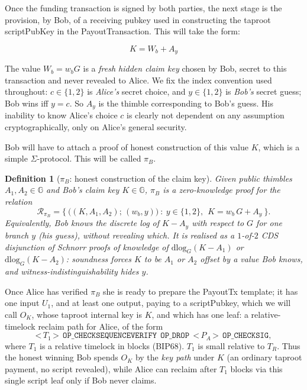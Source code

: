 \documentclass[11pt]{article}
\newtheorem{definition}{Definition}
\begin{document}
Once the funding transaction is signed by both parties, the next stage is the provision, by Bob, of a receiving pubkey used in constructing the taproot scriptPubKey in the PayoutTransaction. This will take the form:

\[ K = W_b + A_y \]

The value $W_b = w_b G$ is a \emph{fresh hidden claim key} chosen by Bob, secret to this transaction and never revealed to Alice. We fix the index convention used throughout: $c\in\{1,2\}$ is \emph{Alice's} secret choice, and $y\in\{1,2\}$ is \emph{Bob's} secret guess; Bob wins iff $y=c$. So $A_y$ is the thimble corresponding to Bob's guess. His inability to know Alice's choice $c$ is clearly not dependent on any assumption cryptographically, only on Alice's general security.

Bob will have to attach a proof of honest construction of this value $K$, which is a simple $\Sigma$-protocol. This will be called $\pi_B$.

\begin{definition}[$\pi_B$: honest construction of the claim key]
\label{def:piB}
Given public thimbles $A_1,A_2\in\mathbb{G}$ and Bob's claim key $K\in\mathbb{G}$, $\pi_B$ is a zero-knowledge proof for the relation
\[
\mathcal{R}_{\pi_B}=\Big\{\ \big((K,A_1,A_2);\,(w_b,y)\big)\ :\ y\in\{1,2\},\ \ K = w_b\,G + A_y\ \Big\}.
\]
Equivalently, Bob knows the discrete log of $K-A_y$ with respect to $G$ for one branch $y$ (his guess), \emph{without revealing which}. It is realised as a $1$-of-$2$ CDS disjunction \cite{cds} of Schnorr proofs of knowledge of $\mathrm{dlog}_G(K-A_1)$ or $\mathrm{dlog}_G(K-A_2)$: soundness forces $K$ to be $A_1$ or $A_2$ offset by a value Bob knows, and witness-indistinguishability hides $y$.
\end{definition}

Once Alice has verified $\pi_B$ she is ready to prepare the PayoutTx template; it has one input $U_1$, and at least one output, paying to a scriptPubkey, which we will call $O_K$, whose taproot internal key is $K$, and which has one leaf: a relative-timelock reclaim path for Alice, of the form
\[
\texttt{<}\,T_1\,\texttt{>}\ \ \texttt{OP\_CHECKSEQUENCEVERIFY}\ \ \texttt{OP\_DROP}\ \ \texttt{<}\,P_A\,\texttt{>}\ \ \texttt{OP\_CHECKSIG},
\]
where $T_1$ is a relative timelock in blocks (BIP68). $T_1$ is small relative to $T_R$. Thus the honest winning Bob spends $O_K$ by the \emph{key path} under $K$ (an ordinary taproot payment, no script revealed), while Alice can reclaim after $T_1$ blocks via this single script leaf only if Bob never claims.
\end{document}
